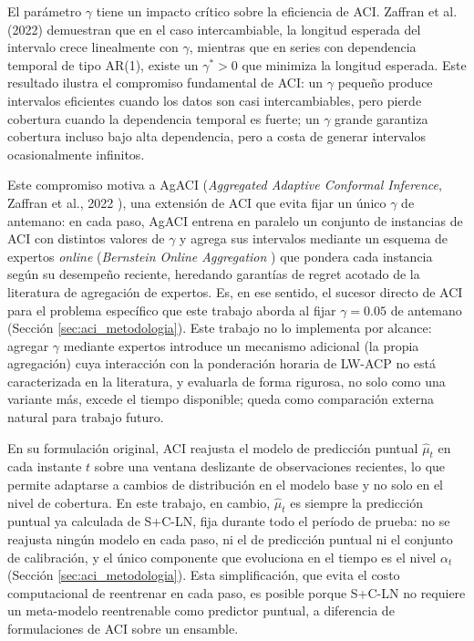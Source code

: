El parámetro $\gamma$ tiene un impacto crítico sobre la eficiencia de ACI. Zaffran et al. (2022) \cite{ZaffranICML2022} demuestran que en el caso intercambiable, la longitud esperada del intervalo crece linealmente con $\gamma$, mientras que en series con dependencia temporal de tipo AR(1), existe un $\gamma^* > 0$ que minimiza la longitud esperada. Este resultado ilustra el compromiso fundamental de ACI: un $\gamma$ pequeño produce intervalos eficientes cuando los datos son casi intercambiables, pero pierde cobertura cuando la dependencia temporal es fuerte; un $\gamma$ grande garantiza cobertura incluso bajo alta dependencia, pero a costa de generar intervalos ocasionalmente infinitos.

Este compromiso motiva a AgACI (\textit{Aggregated Adaptive Conformal Inference}, Zaffran et al., 2022 \cite{ZaffranICML2022}), una extensión de ACI que evita fijar un único $\gamma$ de antemano: en cada paso, AgACI entrena en paralelo un conjunto de instancias de ACI con distintos valores de $\gamma$ y agrega sus intervalos mediante un esquema de expertos \textit{online} (\textit{Bernstein Online Aggregation} \cite{Wintenberger2017BOA}) que pondera cada instancia según su desempeño reciente, heredando garantías de regret acotado de la literatura de agregación de expertos. Es, en ese sentido, el sucesor directo de ACI para el problema específico que este trabajo aborda al fijar $\gamma = 0.05$ de antemano (Sección \ref{sec:aci_metodologia}). Este trabajo no lo implementa por alcance: agregar $\gamma$ mediante expertos introduce un mecanismo adicional (la propia agregación) cuya interacción con la ponderación horaria de LW-ACP no está caracterizada en la literatura, y evaluarla de forma rigurosa, no solo como una variante más, excede el tiempo disponible; queda como comparación externa natural para trabajo futuro.

En su formulación original, ACI reajusta el modelo de predicción puntual $\hat{\mu}_t$ en cada instante $t$ sobre una ventana deslizante de observaciones recientes, lo que permite adaptarse a cambios de distribución en el modelo base y no solo en el nivel de cobertura. En este trabajo, en cambio, $\hat{\mu}_t$ es siempre la predicción puntual ya calculada de S+C-LN, fija durante todo el período de prueba: no se reajusta ningún modelo en cada paso, ni el de predicción puntual ni el conjunto de calibración, y el único componente que evoluciona en el tiempo es el nivel $\alpha_t$ (Sección \ref{sec:aci_metodologia}). Esta simplificación, que evita el costo computacional de reentrenar en cada paso, es posible porque S+C-LN no requiere un meta-modelo reentrenable como predictor puntual, a diferencia de formulaciones de ACI sobre un ensamble.

